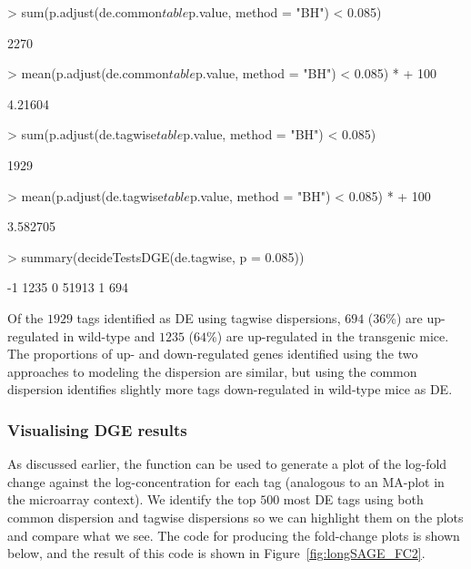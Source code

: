 \begin{Schunk}
\begin{Sinput}
> sum(p.adjust(de.common$table$p.value, method = "BH") < 0.085)
\end{Sinput}
\begin{Soutput}
[1] 2270
\end{Soutput}
\begin{Sinput}
> mean(p.adjust(de.common$table$p.value, method = "BH") < 0.085) * 
+     100
\end{Sinput}
\begin{Soutput}
[1] 4.21604
\end{Soutput}
\begin{Sinput}
> sum(p.adjust(de.tagwise$table$p.value, method = "BH") < 0.085)
\end{Sinput}
\begin{Soutput}
[1] 1929
\end{Soutput}
\begin{Sinput}
> mean(p.adjust(de.tagwise$table$p.value, method = "BH") < 0.085) * 
+     100
\end{Sinput}
\begin{Soutput}
[1] 3.582705
\end{Soutput}
\begin{Sinput}
> summary(decideTestsDGE(de.tagwise, p = 0.085))
\end{Sinput}
\begin{Soutput}
   [,1] 
-1  1235
0  51913
1    694
\end{Soutput}
\end{Schunk}

Of the $1929$ tags identified as DE using tagwise dispersions, $694$
($36$\%) are up-regulated in wild-type and $1235$ ($64$\%) are
up-regulated in the transgenic mice. The proportions of up- and
down-regulated genes identified using the two approaches to modeling
the dispersion are similar, but using the common dispersion identifies
slightly more tags down-regulated in wild-type mice as DE.


\subsubsection{Visualising DGE results}
As discussed earlier, the function  can be used to
generate a plot of the log-fold change against the log-concentration
for each tag (analogous to an MA-plot in the microarray context). We
identify the top $500$ most DE tags using both common dispersion and
tagwise dispersions so we can highlight them on the plots and compare
what we see. The code for producing the fold-change plots is shown
below, and the result of this code is shown in
Figure~\ref{fig:longSAGE_FC2}.

